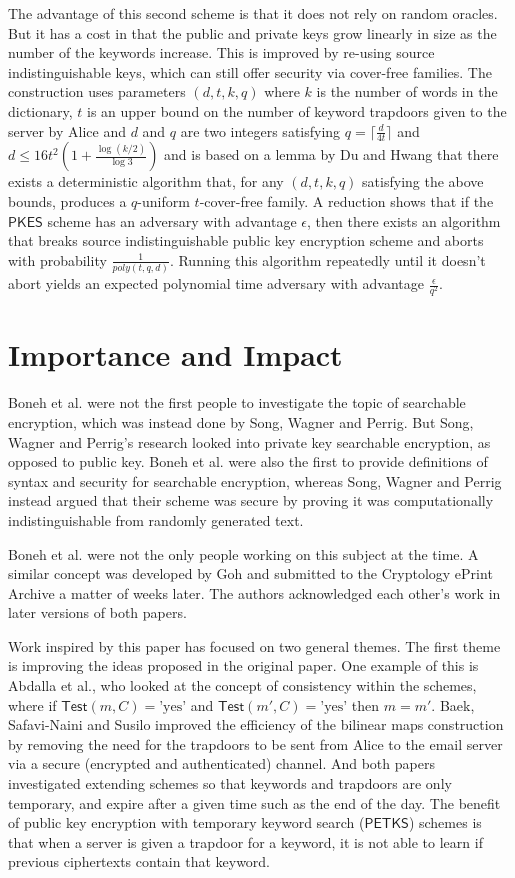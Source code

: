 \documentclass[a4paper,11pt]{article}
\begin{document}
    The advantage of this second scheme is that it does not rely on random oracles. But it has a cost in that the public and private keys grow linearly in size as the number of the keywords increase. This is improved by re-using source indistinguishable keys, which can still offer security via cover-free families. The construction uses parameters $(d, t, k, q)$ where $k$ is the number of words in the dictionary, $t$ is an upper bound on the number of keyword trapdoors given to the server by Alice and $d$ and $q$ are two integers satisfying $q = \lceil \frac{d}{4t} \rceil$ and $d \leq 16t^2(1 + \frac{\log(k/2)}{\log 3})$ and is based on a lemma by Du and Hwang that there exists a deterministic algorithm that, for any $(d, t, k, q)$ satisfying the above bounds, produces a $q$-uniform $t$-cover-free family. A reduction shows that if the $\mathsf{PKES}$ scheme has an adversary with advantage $\epsilon$, then there exists an algorithm that breaks source indistinguishable public key encryption scheme and aborts with probability $\frac{1}{poly(t, q, d)}$. Running this algorithm repeatedly until it doesn't abort yields an expected polynomial time adversary with advantage $\frac{\epsilon}{q^2}$.

    \section{Importance and Impact}
    Boneh et al. were not the first people to investigate the topic of searchable encryption, which was instead done by Song, Wagner and Perrig\cite{848445}. But Song, Wagner and Perrig's research looked into private key searchable encryption, as opposed to public key. Boneh et al. were also the first to provide definitions of syntax and security for searchable encryption, whereas Song, Wagner and Perrig instead argued that their scheme was secure by proving it was computationally indistinguishable from randomly generated text.

    Boneh et al. were not the only people working on this subject at the time. A similar concept was developed by Goh\cite{cryptoeprint:2003:216} and submitted to the Cryptology ePrint Archive a matter of weeks later. The authors acknowledged each other's work in later versions of both papers.

    Work inspired by this paper has focused on two general themes. The first theme is improving the ideas proposed in the original paper. One example of this is Abdalla et al.\cite{abdalla:se-revisited}, who looked at the concept of consistency within the schemes, where if $\mathsf{Test}(m, C) = \text{'yes'}$ and $\mathsf{Test}(m', C) = \text{'yes'}$ then $m = m'$. Baek, Safavi-Naini and Susilo\cite{baek:se-revisited} improved the efficiency of the bilinear maps construction by removing the need for the trapdoors to be sent from Alice to the email server via a secure (encrypted and authenticated) channel. And both papers investigated extending schemes so that keywords and trapdoors are only temporary, and expire after a given time such as the end of the day. The benefit of public key encryption with temporary keyword search ($\mathsf{PETKS}$) schemes is that when a server is given a trapdoor for a keyword, it is not able to learn if previous ciphertexts contain that keyword.
\end{document}
